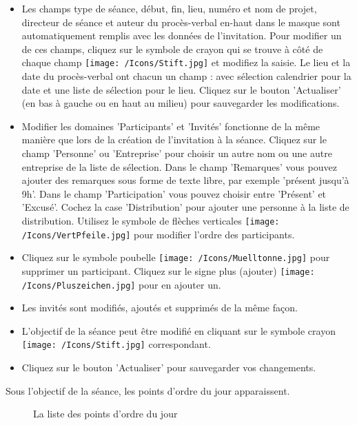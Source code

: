 \begin{itemize}
\item
Les champs type de séance, début, fin, lieu, numéro et nom de projet, directeur de séance et auteur du procès-verbal en-haut dans le masque sont automatiquement remplis avec les données de l'invitation. Pour modifier un de ces champs, cliquez sur le symbole de crayon qui se trouve à côté de chaque champ \texttt{[image: /Icons/Stift.jpg]}  et modifiez la saisie. Le lieu et la date du procès-verbal ont chacun un champ : avec sélection calendrier pour la date et une liste de sélection pour le lieu. Cliquez sur le bouton 'Actualiser'  (en bas à gauche ou en haut au milieu) pour sauvegarder les modifications.
\item
Modifier les domaines 'Participants' et 'Invités'  fonctionne de la même manière que lors de la création de l'invitation à la séance. Cliquez sur le champ 'Personne'  ou 'Entreprise'  pour choisir un autre nom ou une autre entreprise de la liste de sélection. Dans le champ 'Remarques'  vous pouvez ajouter des remarques sous forme de texte libre, par exemple 'présent jusqu'à 9h'. Dans le champ 'Participation'  vous pouvez choisir entre 'Présent' et 'Excusé'. Cochez la case 'Distribution'  pour ajouter une personne à la liste de distribution. Utilisez le symbole de flèches verticales \texttt{[image: /Icons/VertPfeile.jpg]}  pour modifier l'ordre des participants.
\item
Cliquez sur le symbole poubelle \texttt{[image: /Icons/Muelltonne.jpg]}  pour supprimer un participant. Cliquez sur le signe plus (ajouter) \texttt{[image: /Icons/Pluszeichen.jpg]}  pour en ajouter un.
\item
Les invités sont modifiés, ajoutés et supprimés de la même façon.
\item
L'objectif de la séance peut être modifié en cliquant sur le symbole crayon \texttt{[image: /Icons/Stift.jpg]}  correspondant.
\item
Cliquez sur le bouton 'Actualiser'  pour sauvegarder vos changements.
\end{itemize}

Sous l'objectif de la séance, les points d'ordre du jour apparaissent.

\begin{figure}[H]
\caption{La liste des points d'ordre du jour}
\end{figure}

